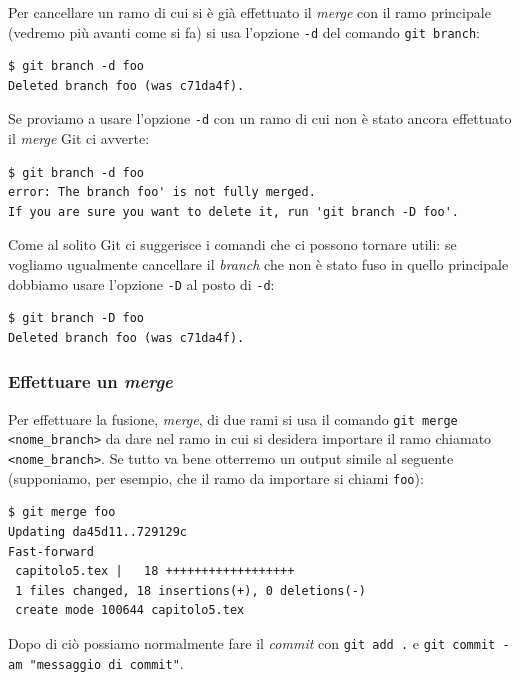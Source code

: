 \documentclass[a4paper,12pt,oneside]{article}
\begin{document}
Per cancellare un ramo di cui si è già effettuato il \emph{merge} con il ramo
principale (vedremo più avanti come si fa) si usa l'opzione \lstinline|-d| del
comando \lstinline|git branch|:
\begin{lstlisting}
$ git branch -d foo
Deleted branch foo (was c71da4f).
\end{lstlisting}
Se proviamo a usare l'opzione \lstinline|-d| con un ramo di cui non è stato
ancora effettuato il \emph{merge} Git ci avverte:
\begin{lstlisting}
$ git branch -d foo
error: The branch foo' is not fully merged.
If you are sure you want to delete it, run 'git branch -D foo'.
\end{lstlisting}
Come al solito Git ci suggerisce i comandi che ci possono tornare utili: se
vogliamo ugualmente cancellare il \emph{branch} che non è stato fuso in quello
principale dobbiamo usare l'opzione \lstinline|-D| al posto di \lstinline|-d|:
\begin{lstlisting}
$ git branch -D foo
Deleted branch foo (was c71da4f).
\end{lstlisting}

\subsubsection{Effettuare un \emph{merge}}
Per effettuare la fusione, \emph{merge}, di due rami si usa il comando
\lstinline|git merge <nome_branch>| da dare nel ramo in cui si desidera importare
il ramo chiamato \lstinline|<nome_branch>|. Se tutto va bene otterremo un output
simile al seguente (supponiamo, per esempio, che il ramo da importare si chiami
\lstinline|foo|):
\begin{lstlisting}
$ git merge foo
Updating da45d11..729129c
Fast-forward
 capitolo5.tex |   18 ++++++++++++++++++
 1 files changed, 18 insertions(+), 0 deletions(-)
 create mode 100644 capitolo5.tex
\end{lstlisting}
Dopo di ciò possiamo normalmente fare il \emph{commit} con
\lstinline|git add .| e \lstinline|git commit -am "messaggio di commit"|.
\end{document}
